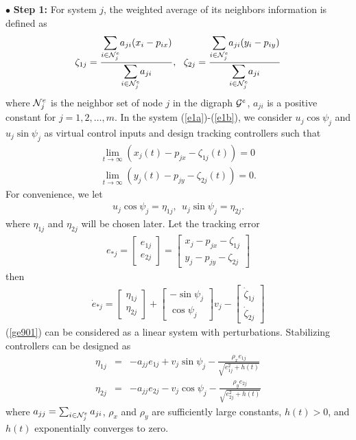 \documentclass[letterpaper, 10 pt, conference]{ieeeconf}  %
\begin{document}
$\bullet$ {\bf Step 1:} For system $j$, the weighted average of its
neighbors information is defined as
\begin{eqnarray}
\zeta_{1j}=\frac{\displaystyle{\sum_{i\in{\cal N}^e_j}}a_{ji}(x_i-p_{ix})}{\displaystyle{\sum_{i\in{\cal N}^e_j}}a_{ji}},~~
\zeta_{2j}=\frac{\displaystyle{\sum_{i\in{\cal
N}^e_j}}a_{ji}(y_i-p_{iy})}{\displaystyle{\sum_{i\in{\cal
N}^e_j}}a_{ji}}\label{gzeta2j}
\end{eqnarray}
where ${\cal N}^e_j$ is the neighbor set of node $j$ in the digraph
${\cal G}^e$,  $a_{ji}$ is a positive constant for $j=1,2,\ldots,m$.
In the system  (\ref{e1a})-(\ref{e1b}), we consider $u_j\cos\psi_j$
and $u_j\sin\psi_j$ as virtual control inputs and design tracking
controllers such that
\begin{eqnarray}
\lim_{t\rightarrow\infty}(x_j(t)-p_{jx}-\zeta_{1j}(t))=0\label{gg1}\\
\lim_{t\rightarrow\infty}(y_j(t)-p_{jy}-\zeta_{2j}(t))=0.\label{gg2}
\end{eqnarray}
 For convenience, we
let
\begin{eqnarray}
u_j\cos\psi_j=\eta_{1j},~~
u_j\sin\psi_j=\eta_{2j}.\label{gtp433}
\end{eqnarray}
where $\eta_{1j}$ and $\eta_{2j}$ will be chosen later. Let the
tracking error
\begin{eqnarray}
e_{*j}=\left[\begin{array}{c}e_{1j}\\
e_{2j}\end{array}\right]=\left[\begin{array}{c}x_j-p_{jx}-\zeta_{1j}\\
y_j-p_{jy}-\zeta_{2j}\end{array}\right] \label{ge_def}
\end{eqnarray}
then
\begin{eqnarray}
\dot{e}_{*j}=\left[\begin{array}{c}\eta_{1j}\\
\eta_{2j}\end{array}\right]+\left[\begin{array}{c}-\sin\psi_j\\
\cos\psi_j\end{array}\right]v_j
-\left[\begin{array}{c}\dot{\zeta}_{1j}\\
\dot{\zeta}_{2j}\end{array}\right]\label{ge901}
\end{eqnarray}
(\ref{ge901}) can be considered as a linear system with
perturbations. Stabilizing controllers can be designed as
\begin{eqnarray}
\eta_{1j}&=&-a_{jj}e_{1j}+v_j\sin\psi_j-\frac{\rho_{x}e_{1j}}{\sqrt{e^2_{1j}+h(t)}}\label{geta1j} \\
\eta_{2j}&=&-a_{jj}e_{2j}-v_j\cos\psi_j-\frac{\rho_{y}e_{2j}}{\sqrt{e^2_{2j}+h(t)}}\label{geta2j}
\end{eqnarray}
where $a_{jj}=\sum_{i\in{\cal N}^e_j}a_{ji}$, $\rho_{x}$ and
$\rho_y$ are sufficiently large constants, $h(t)>0$, and $h(t)$
exponentially converges to zero.
\end{document}
